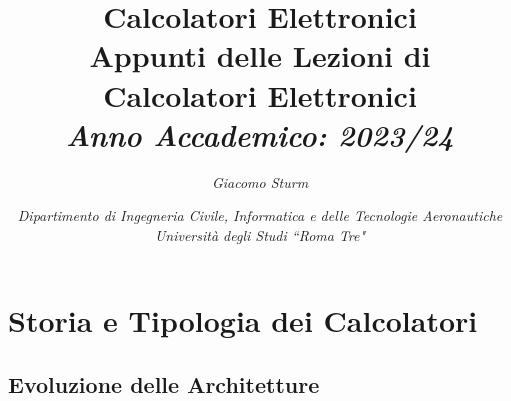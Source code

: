\documentclass{article}
\numberwithin{equation}{subsection}
\begin{document}
\title{%
    \textbf{Calcolatori Elettronici}  \\ 
    \large Appunti delle Lezioni di Calcolatori Elettronici \\
    \textit{Anno Accademico: 2023/24}}
\author{\textit{Giacomo Sturm}}
\date{\textit{Dipartimento di Ingegneria Civile, Informatica e delle Tecnologie Aeronautiche \\
Università degli Studi ``Roma Tre"}}

\maketitle
\thispagestyle{link}

\clearpage


\pagestyle{fancy}
\fancyhead{}\fancyfoot{}
\fancyfoot[C]{\thepage}

\tableofcontents

\clearpage
{}










\section{Storia e Tipologia dei Calcolatori}


\subsection{Evoluzione delle Architetture}
\end{document}
